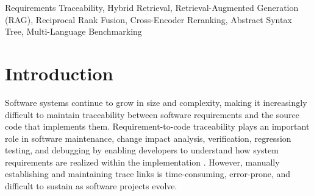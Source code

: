 \documentclass[conference]{IEEEtran}
\begin{document}
\begin{abstract}
Maintaining traceability between software requirements and source code is fundamental to software maintenance, impact analysis, verification, and debugging. In practice, however, manually establishing and maintaining trace links is labor-intensive and often fails to keep pace with evolving software systems. This paper presents \textit{TraceAI}, a hybrid retrieval framework for automated requirement-to-code traceability that combines BM25 lexical retrieval, dense semantic retrieval, Reciprocal Rank Fusion (RRF), cross-encoder reranking, and Abstract Syntax Tree (AST)-based code segmentation. To improve the interpretability of the generated trace links, the framework also integrates Retrieval-Augmented Generation (RAG) to produce natural-language explanations. The proposed approach is evaluated across three software engineering benchmarks (iTrust, eTour, and LibEST) spanning Java and C, achieving an average Hit@10 of 87.3\%, Recall@10 of 65.03\%, and MRR of 0.6694. Component ablation isolates the contributions of lexical, dense, and rank-fusion stages, while an empirical grounding audit confirms the factual faithfulness of generated explanations. The evaluation further analyzes performance across requirement categories and examines framework scalability on repositories of increasing size. The findings indicate that TraceAI provides an effective and practical approach for automated requirement-to-code traceability.
\end{abstract}

\begin{IEEEkeywords}
Requirements Traceability, Hybrid Retrieval, Retrieval-Augmented Generation (RAG), Reciprocal Rank Fusion, Cross-Encoder Reranking, Abstract Syntax Tree, Multi-Language Benchmarking
\end{IEEEkeywords}

\section{Introduction}

Software systems continue to grow in size and complexity, making it increasingly difficult to maintain traceability between software requirements and the source code that implements them. Requirement-to-code traceability plays an important role in software maintenance, change impact analysis, verification, regression testing, and debugging by enabling developers to understand how system requirements are realized within the implementation \cite{ref5}. However, manually establishing and maintaining trace links is time-consuming, error-prone, and difficult to sustain as software projects evolve.
\end{document}
